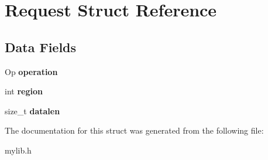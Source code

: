 \hypertarget{struct_request}{}\section{Request Struct Reference}
\label{struct_request}
\subsection*{Data Fields}
\begin{DoxyCompactItemize}
\item 
\mbox{\label{struct_request_ae7f9ec467b484df17933b3b9d53eb1f4}} 
Op {\bfseries operation}
\item 
\mbox{\label{struct_request_ae65983b9419c48cac6d5b2340adaa501}} 
int {\bfseries region}
\item 
\mbox{\label{struct_request_a3d12e161726566d24a1d0cf6c6b416bb}} 
size\+\_\+t {\bfseries datalen}
\end{DoxyCompactItemize}


The documentation for this struct was generated from the following file\+:\begin{DoxyCompactItemize}
\item 
mylib.\+h\end{DoxyCompactItemize}
